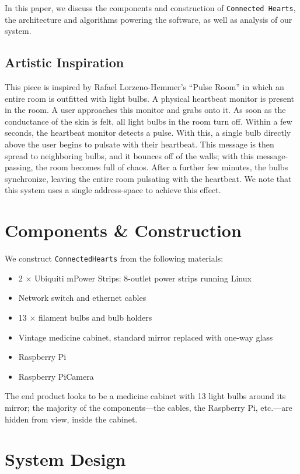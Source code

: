 \documentclass[preprint,review,12pt]{cs262}
\begin{document}
In this paper, we discuss the components and construction of  \texttt{Connected Hearts}, the architecture and algorithms powering the software, as well as analysis of our system. 

\subsection{Artistic Inspiration}

This piece is inspired by Rafael Lorzeno-Hemmer's ``Pulse Room''\cite{pulse} in which an entire room is outfitted with light bulbs. A physical heartbeat monitor is present in the room. A user approaches this monitor and grabs onto it. As soon as the conductance of the skin is felt, all light bulbs in the room turn off. Within a few seconds, the heartbeat monitor detects a pulse. With this, a single bulb directly above the user begins to pulsate with their heartbeat. This message is then spread to neighboring bulbs, and it bounces off of the walls; with this message-passing, the room becomes full of chaos. After a further few minutes, the bulbs synchronize, leaving the entire room pulsating with the heartbeat. We note that this system uses a single address-space to achieve this effect. 


\section{Components \& Construction}

\noindent We construct \texttt{ConnectedHearts} from the following materials:
\begin{itemize} 
\item 2 $\times$ Ubiquiti mPower Strips: 8-outlet power strips running Linux
\item Network switch and ethernet cables
\item 13 $\times$ filament bulbs and bulb holders
\item Vintage medicine cabinet, standard mirror replaced with one-way glass
\item Raspberry Pi
\item Raspberry PiCamera
\end{itemize} 

The end product looks to be a medicine cabinet with 13 light bulbs around its mirror; the majority of the components---the cables, the Raspberry Pi, etc.---are hidden from view, inside the cabinet. 

\section{System Design}
\end{document}
